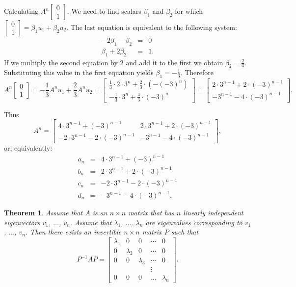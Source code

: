 \documentclass[11pt]{article}
\newtheorem{thm}{Theorem}[section]
\theoremstyle{definition}
\theoremstyle{plain}
\begin{document}
Calculating \( A^n\left[\begin{array}{c}0\\1\end{array}\right]\). We need to find scalars \( \beta_1 \) and \( \beta_2 \) for which \( \left[\begin{array}{c}0\\1\end{array}\right]=\beta_1u_1+\beta_2 u_2\). The last equation is equivalent to the following system: \begin{eqnarray*} -2\beta_1-\beta_2&=&0\\ \beta_1+2\beta_2&=&1. \end{eqnarray*} If we multiply the second equation by \( 2 \) and add it to the first we obtain \( \beta_2=\frac23 \). Substituting this value in the first equation yields \( \beta_1=-\frac13 \). Therefore \[A^n\left[\begin{array}{c}0\\1\end{array}\right]=-\frac13A^nu_1+\frac23A^nu_2= \left[\begin{array}{c} \frac13\cdot 2\cdot 3^n+\frac23\cdot (-(-3)^n)\\ -\frac13\cdot 3^n+\frac43\cdot (-3)^n \end{array}\right] =\left[\begin{array}{c} 2\cdot 3^{n-1}+2\cdot (-3)^{n-1}\\ - 3^{n-1}-4\cdot (-3)^{n-1} \end{array}\right] .\]

Thus \[A^n=\left[\begin{array}{cc} 4\cdot 3^{n-1}+(-3)^{n-1} & 2\cdot 3^{n-1}+2\cdot (-3)^{n-1}\\ -2\cdot 3^{n-1}-2\cdot (-3)^{n-1} & - 3^{n-1}-4\cdot (-3)^{n-1} \end{array}\right], \] or, equivalently: \begin{eqnarray*} a_n&=&4\cdot 3^{n-1}+(-3)^{n-1} \\ b_n&=&2\cdot 3^{n-1}+2\cdot (-3)^{n-1}\\ c_n&=& -2\cdot 3^{n-1}-2\cdot (-3)^{n-1} \\ d_n&=& - 3^{n-1}-4\cdot (-3)^{n-1}. \end{eqnarray*}

\begin{thm}
Assume that \( A \) is an \( n\times n \) matrix that has \( n \) linearly independent eigenvectors \( v_1 \), \( \dots \), \( v_n \). Assume that \( \lambda_1 \), \( \dots \), \( \lambda_n \) are eigenvalues corresponding to \( v_1 \), \( \dots \), \( v_n \). Then there exists an invertible \( n\times n \) matrix \( P \) such that \[ P^{-1}AP=\left[\begin{array}{ccccc} \lambda_1&0&0&\cdots&0\\0&\lambda_2&0&\cdots&0\\ 0&0&\lambda_3&\cdots&0\\&&&\vdots&\\ 0&0&0&\dots&\lambda_n\end{array}\right].\]
\end{thm}
\end{document}

